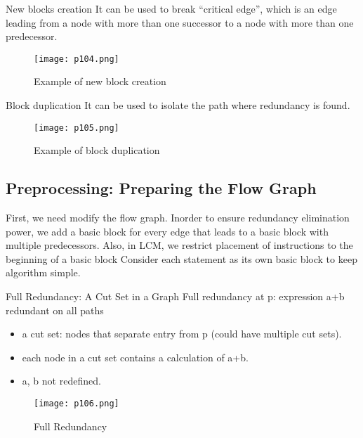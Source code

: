 \begin{definition}{New blocks creation}
    It can be used to break {\color{red}“critical edge”},
    which is an edge leading from a node with more than one
    successor to a node with more than one predecessor.
    \begin{figure}[H]
        \centering
         \texttt{[image: p104.png]}
             \caption{Example of new block creation}
             \label{fig:p104}
    \end{figure}

\end{definition}

\begin{definition}{Block duplication}
    It can be used to isolate the path where
    redundancy is found.
    \begin{figure}[H]
        \centering
         \texttt{[image: p105.png]}
             \caption{Example of block duplication}
             \label{fig:p105}
    \end{figure}

\end{definition}


\subsection{Preprocessing: Preparing the Flow Graph}

First, we need modify the flow graph. Inorder to ensure redundancy elimination power, we add
a basic block for every edge that leads to a basic block with multiple
predecessors. Also, in LCM, we restrict placement of instructions to the beginning of a basic block
Consider each statement as its own basic block to keep algorithm simple.


\begin{definition}{Full Redundancy: A Cut Set in a Graph}
    Full redundancy at p: expression a+b redundant on all paths
    \begin{itemize}
    \item a cut set: nodes that separate entry from p (could have multiple cut sets).
    \item each node in a cut set contains a calculation of a+b.
    \item a, b not redefined.
    \end{itemize}

    \begin{figure}[H]
        \centering
         \texttt{[image: p106.png]}
             \caption{Full Redundancy}
             \label{fig:p106}
    \end{figure}
\end{definition}


